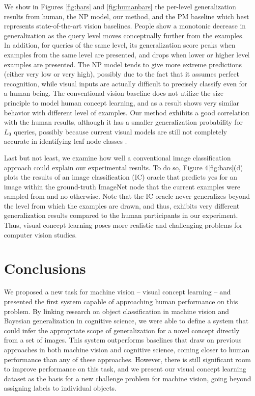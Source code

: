 We show in Figures \ref{fig:bars} and \ref{fig:humanbars} the per-level generalization results from human, the NP model, our method, and the PM baseline which best represents state-of-the-art vision baselines. People show a monotonic decrease in generalization as the query level moves conceptually further from the examples. In addition, for queries of the same level, its generalization score peaks when examples from the same level are presented, and drops when lower or higher level examples are presented. The NP model tends to give more extreme predictions (either very low or very high), possibly due to the fact that it assumes perfect recognition, while visual inputs are actually difficult to precisely classify even for a human being. The conventional vision baseline does not utilize the size principle to model human concept learning, and as a result shows very similar behavior with different level of examples. Our method exhibits a good correlation with the human results, although it has a smaller generalization probability for $L_0$ queries, possibly because current visual models are still not completely accurate in identifying leaf node classes \cite{deng2012hedging}.

Last but not least, we examine how well a conventional image classification approach could explain our experimental results. To do so, Figure 4\ref{fig:bars}(d) plots the results of an image classification (IC) oracle that predicts yes for an image within the ground-truth ImageNet node that the current examples were sampled from and no otherwise. Note that the IC oracle never generalizes beyond the level from which the examples are drawn, and thus, exhibits very different generalization results compared to the human participants in our experiment. Thus, visual concept learning poses more realistic and challenging problems for computer vision studies.


\section{Conclusions}

We proposed a new task for machine vision -- visual
concept learning -- and presented the first system capable of approaching
human performance on this problem. By linking research on object
classification in machine vision and Bayesian generalization in cognitive
science, we were able to define a system that could infer the appropriate
scope of generalization for a novel concept directly from a set of
images. This system outperforms baselines that draw on previous approaches
in both machine vision and cognitive science, coming closer to human
performance than any of these approaches. However, there is still
significant room to improve performance on this task, and we present our
visual concept learning dataset as the basis for a new challenge problem
for machine vision, going beyond assigning labels to individual objects.

